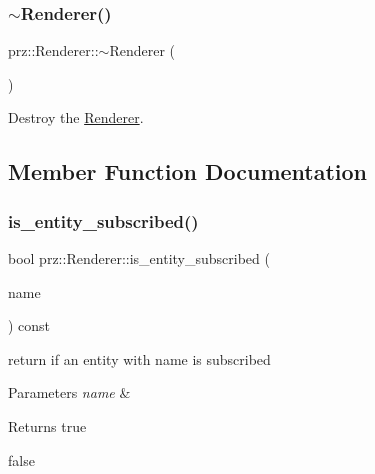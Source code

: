 \subsubsection{\texorpdfstring{$\sim$Renderer()}{~Renderer()}}
{\footnotesize\ttfamily prz\+::\+Renderer\+::$\sim$\+Renderer (\begin{DoxyParamCaption}{ }\end{DoxyParamCaption})\hspace{0.3cm}{\ttfamily [inline]}}



Destroy the \mbox{\hyperlink{classprz_1_1_renderer}{Renderer}}. 



\subsection{Member Function Documentation}
\mbox{\label{classprz_1_1_renderer_ae2cc6d2d4a5668f2ef91bc2d994fa9d3}} 
\subsubsection{\texorpdfstring{is\_entity\_subscribed()}{is\_entity\_subscribed()}\hspace{0.1cm}{\footnotesize\ttfamily [1/2]}}
{\footnotesize\ttfamily bool prz\+::\+Renderer\+::is\+\_\+entity\+\_\+subscribed (\begin{DoxyParamCaption}\item[{const P\+String \&}]{name }\end{DoxyParamCaption}) const\hspace{0.3cm}{\ttfamily [inline]}}



return if an entity with name is subscribed 


\begin{DoxyParams}{Parameters}
{\em name} & \\
\hline
\end{DoxyParams}
\begin{DoxyReturn}{Returns}
true 

false 
\end{DoxyReturn}
\mbox{\label{classprz_1_1_renderer_a669ce404b1d420c1ebd6ed66925b3289}} 
